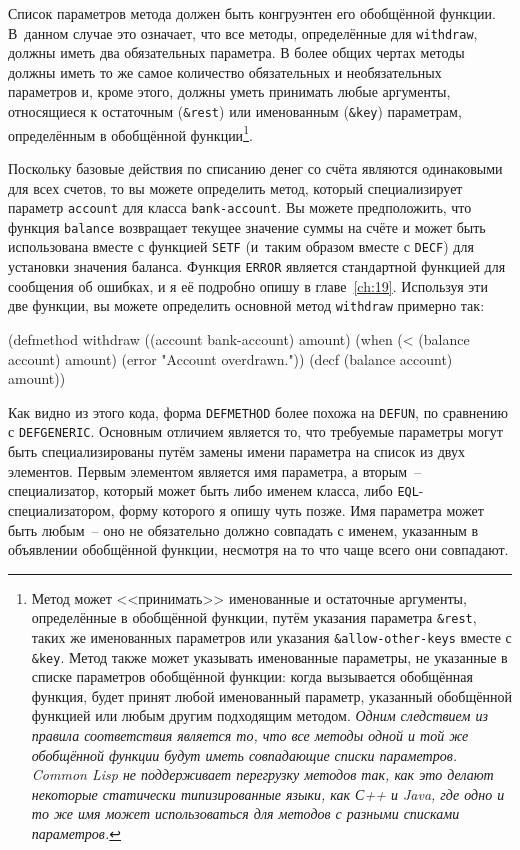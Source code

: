 Список параметров метода должен быть конгруэнтен его обобщённой функции.  В~данном случае
это означает, что все методы, определённые для \lstinline{withdraw}, должны иметь два
обязательных параметра.  В более общих чертах методы должны иметь то же самое количество
обязательных и необязательных параметров и, кроме этого, должны уметь принимать любые
аргументы, относящиеся к остаточным (\lstinline!&rest!) или именованным (\lstinline!&key!)
параметрам, определённым в обобщённой функции\footnote{Метод может <<принимать>>
  именованные и остаточные аргументы, определённые в обобщённой функции, путём указания
  параметра \lstinline!&rest!, таких же именованных параметров или указания
  \lstinline!&allow-other-keys! вместе с \lstinline!&key!.  Метод также может указывать
  именованные параметры, не указанные в списке параметров обобщённой функции: когда
  вызывается обобщённая функция, будет принят любой именованный параметр, указанный
  обобщённой функцией или любым другим подходящим методом.  \textit{Одним следствием
    из правила соответствия является то, что все методы одной и той же обобщённой функции
    будут иметь совпадающие списки параметров.  Common Lisp не поддерживает перегрузку
    методов так, как это делают некоторые статически типизированные языки, как С++ и Java,
    где одно и то же имя может использоваться для методов с разными списками параметров.}
}.

Поскольку базовые действия по списанию денег со счёта являются одинаковыми для всех
счетов, то вы можете определить метод, который специализирует параметр \lstinline{account}
для класса \lstinline{bank-account}.  Вы можете предположить, что функция
\lstinline{balance} возвращает текущее значение суммы на счёте и может быть использована
вместе с функцией \lstinline{SETF} (и~таким образом вместе с \lstinline{DECF}) для
установки значения баланса.  Функция \lstinline{ERROR} является стандартной функцией для
сообщения об ошибках, и я её подробно опишу в главе~\ref{ch:19}.  Используя эти две
функции, вы можете определить основной метод \lstinline{withdraw} примерно так:

\begin{myverb}
(defmethod withdraw ((account bank-account) amount)
  (when (< (balance account) amount)
    (error "Account overdrawn."))
  (decf (balance account) amount))
\end{myverb}

Как видно из этого кода, форма \lstinline{DEFMETHOD} более похожа на \lstinline{DEFUN}, по сравнению
с \lstinline{DEFGENERIC}.  Основным отличием является то, что требуемые параметры могут быть
специализированы путём замены имени параметра на список из двух элементов.  Первым
элементом является имя параметра, а вторым~-- специализатор, который может быть либо
именем класса, либо \lstinline{EQL}-специализатором, форму которого я опишу чуть позже.  Имя
параметра может быть любым~-- оно не обязательно должно совпадать с именем, указанным в
объявлении обобщённой функции, несмотря на то что чаще всего они совпадают.

